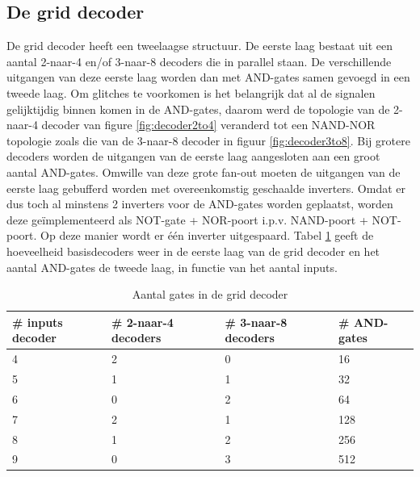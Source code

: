 \subsection{De grid decoder}
De grid decoder heeft een tweelaagse structuur. De eerste laag bestaat uit een aantal 2-naar-4 en/of 3-naar-8 decoders die in parallel staan. De verschillende uitgangen van deze eerste laag worden dan met AND-gates samen gevoegd in een tweede laag. Om glitches te voorkomen is het belangrijk dat al de signalen gelijktijdig binnen komen in de AND-gates, daarom werd de topologie van de 2-naar-4 decoder van figure \ref{fig:decoder2to4} veranderd tot een NAND-NOR topologie zoals die van de 3-naar-8 decoder in figuur \ref{fig:decoder3to8}. Bij grotere decoders worden de uitgangen van de eerste laag aangesloten aan een groot aantal AND-gates. Omwille van deze grote fan-out moeten de uitgangen van de eerste laag gebufferd worden met overeenkomstig geschaalde inverters. Omdat er dus toch al minstens 2 inverters voor de AND-gates worden geplaatst, worden deze geïmplementeerd als NOT-gate + NOR-poort i.p.v. NAND-poort + NOT-poort. Op deze manier wordt er één inverter uitgespaard. Tabel \ref{tab:griddecoder} geeft de hoeveelheid basisdecoders weer in de eerste laag van de grid decoder en het aantal AND-gates de tweede laag, in functie van het aantal inputs.

\begin{table}
\begin{center}
\begin{tabular}{llll}
\hline
\# inputs decoder & \# 2-naar-4 decoders & \# 3-naar-8 decoders & \# AND-gates\\
\hline
4 & 2 & 0 & 16\\
5 & 1 & 1 & 32\\
6 & 0 & 2 & 64\\
7 & 2 & 1 & 128\\
8 & 1 & 2 & 256\\
9 & 0 & 3 & 512\\
\hline
\end{tabular}
\end{center}
\caption[aantal gates in de grid decoder]{Aantal gates in de grid decoder}
\label{tab:griddecoder}
\end{table}


